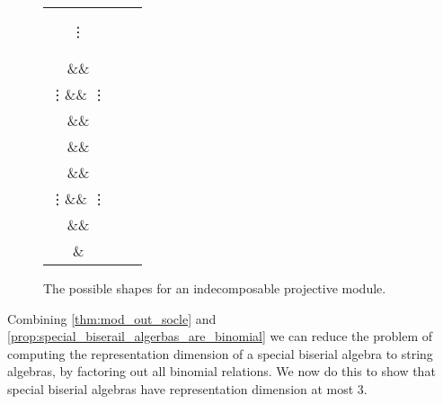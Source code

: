 \begin{figure}
	\centering
\setlength{\tabcolsep}{30pt}
\begin{tabular}{ccc}
	\begin{tikzcd}
	\bullet\ar[d]\\
	\bullet\ar[d]\\
	\vdots\ar[d]\\
	\bullet\ar[d]\\
	\bullet
	\end{tikzcd}
	&
	\begin{tikzcd}[ampersand replacement=\&, column sep = 10pt]
	\&\bullet\ar[dl]\ar[dr]\\
	\bullet\ar[d] \&\& \bullet\ar[d]\\
	\vdots\ar[d] \&\& \vdots\ar[d]\\
	\bullet \&\& \bullet\ar[d]\\
	\&\&\bullet
	\end{tikzcd}
	&
	\begin{tikzcd}[ampersand replacement=\&, column sep = 10pt]
	\&\bullet\ar[dl]\ar[dr]\\
	\bullet\ar[d] \&\& \bullet\ar[d]\\
	\vdots\ar[d] \&\& \vdots\ar[d]\\
	\bullet\ar[dr] \&\& \bullet\ar[dl]\\
	\&\bullet
	\end{tikzcd}
\end{tabular}

\caption{The possible shapes for an indecomposable projective module.}\label{fig:biserial_projectives}
\end{figure}

Combining \cref{thm:mod_out_socle} and \cref{prop:special_biserail_algerbas_are_binomial} we can reduce the problem of computing the representation dimension of a special biserial algebra to string algebras, by factoring out all binomial relations. We now do this to show that special biserial algebras have representation dimension at most 3.


